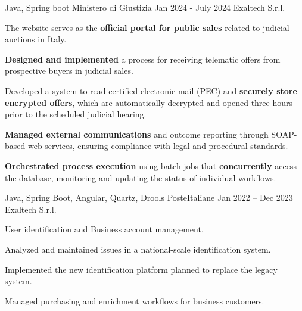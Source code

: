 \begin{cventries}
  \cventry
    {Java, Spring boot} %
    {Ministero di Giustizia} %
    {Jan 2024 - July 2024} %
    {Exaltech S.r.l.} %
    {
      \begin{cvitems} %
        \item {The website serves as the \textbf{official portal for public sales} related to judicial auctions in Italy.}
        \item {\textbf{Designed and implemented} a process for receiving telematic offers from prospective buyers in judicial sales.}
        \item {Developed a system to read certified electronic mail (PEC) and \textbf{securely store encrypted offers}, which are automatically decrypted and opened three hours prior to the scheduled judicial hearing.}  
        \item {\textbf{Managed external communications} and outcome reporting through SOAP-based web services, ensuring compliance with legal and procedural standards.}  
        \item {\textbf{Orchestrated process execution} using batch jobs that \textbf{concurrently} access the database, monitoring and updating the status of individual workflows.}  
      \end{cvitems}
    }

  \cventry
    {Java, Spring Boot, Angular, Quartz, Drools} %
    {PosteItaliane} %
    {Jan 2022 – Dec 2023} %
    {Exaltech S.r.l.} %
    {
      \begin{cvitems} %
        \item {User identification and Business account management.}
        \item {Analyzed and maintained issues in a national-scale identification system.}
        \item {Implemented the new identification platform planned to replace the legacy system.}  
        \item {Managed purchasing and enrichment workflows for business customers.}  
      \end{cvitems}
    }
\end{cventries}
